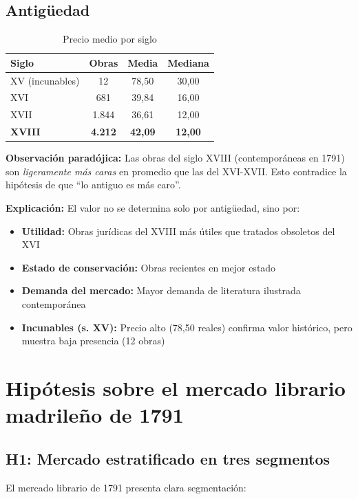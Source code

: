 \documentclass[12pt,a4paper]{article}
\begin{document}
\subsection{Antigüedad}

\begin{table}[h]
\centering
\caption{Precio medio por siglo}
\begin{tabular}{lccc}
\toprule
\textbf{Siglo} & \textbf{Obras} & \textbf{Media} & \textbf{Mediana} \\
\midrule
XV (incunables) & 12 & 78,50 & 30,00 \\
XVI & 681 & 39,84 & 16,00 \\
XVII & 1.844 & 36,61 & 12,00 \\
\textbf{XVIII} & \textbf{4.212} & \textbf{42,09} & \textbf{12,00} \\
\bottomrule
\end{tabular}
\end{table}

\textbf{Observación paradójica:} Las obras del siglo XVIII (contemporáneas en 1791) son \textit{ligeramente más caras} en promedio que las del XVI-XVII. Esto contradice la hipótesis de que ``lo antiguo es más caro''.

\textbf{Explicación:} El valor no se determina solo por antigüedad, sino por:
\begin{itemize}
    \item \textbf{Utilidad:} Obras jurídicas del XVIII más útiles que tratados obsoletos del XVI
    \item \textbf{Estado de conservación:} Obras recientes en mejor estado
    \item \textbf{Demanda del mercado:} Mayor demanda de literatura ilustrada contemporánea
    \item \textbf{Incunables (s. XV):} Precio alto (78,50 reales) confirma valor histórico, pero muestra baja presencia (12 obras)
\end{itemize}

\section{Hipótesis sobre el mercado librario madrileño de 1791}

\subsection{H1: Mercado estratificado en tres segmentos}

El mercado librario de 1791 presenta clara segmentación:
\end{document}
